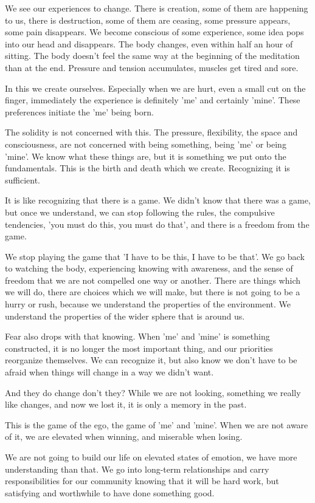 We see our experiences to change. There is creation, some of them are
happening to us, there is destruction, some of them are ceasing, some
pressure appears, some pain disappears. We become conscious of some
experience, some idea pops into our head and disappears. The body
changes, even within half an hour of sitting. The body doesn't feel the
same way at the beginning of the meditation than at the end. Pressure
and tension accumulates, muscles get tired and sore.

In this we create ourselves. Especially when we are hurt, even a small
cut on the finger, immediately the experience is definitely 'me' and
certainly 'mine'. These preferences initiate the 'me' being born.

The solidity is not concerned with this. The pressure, flexibility, the
space and consciousness, are not concerned with being something, being
'me' or being 'mine'. We know what these things are, but it is something
we put onto the fundamentals. This is the birth and death which we
create. Recognizing it is sufficient.

It is like recognizing that there is a game. We didn't know that there
was a game, but once we understand, we can stop following the rules, the
compulsive tendencies, 'you must do this, you must do that', and there
is a freedom from the game.

We stop playing the game that 'I have to be this, I have to be that'. We
go back to watching the body, experiencing knowing with awareness, and
the sense of freedom that we are not compelled one way or another. There
are things which we will do, there are choices which we will make, but
there is not going to be a hurry or rush, because we understand the
properties of the environment. We understand the properties of the wider
sphere that is around us.

Fear also drops with that knowing. When 'me' and 'mine' is something
constructed, it is no longer the most important thing, and our
priorities reorganize themselves. We can recognize it, but also know we
don't have to be afraid when things will change in a way we didn't want.

And they do change don't they? While we are not looking, something we
really like changes, and now we lost it, it is only a memory in the
past.

This is the game of the ego, the game of 'me' and 'mine'. When we are
not aware of it, we are elevated when winning, and miserable when
losing.

We are not going to build our life on elevated states of emotion, we
have more understanding than that. We go into long-term relationships
and carry responsibilities for our community knowing that it will be
hard work, but satisfying and worthwhile to have done something good.

